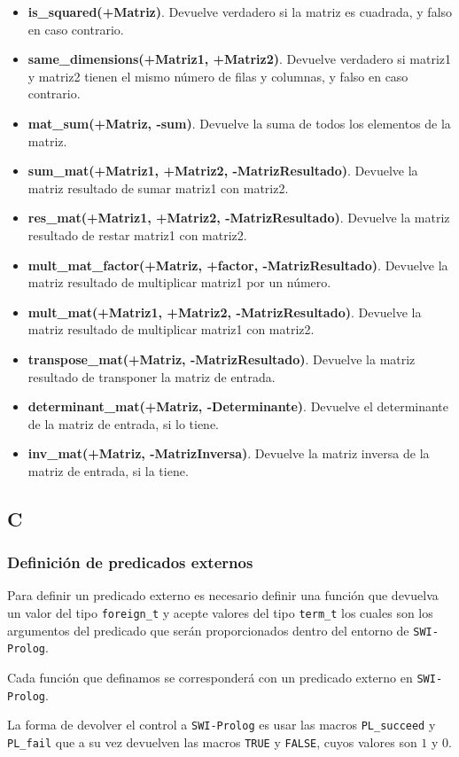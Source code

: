 \documentclass[a4paper]{article}
\begin{document}
\begin{itemize}
\item \textbf{is\_squared(+Matriz)}. Devuelve verdadero si la matriz es cuadrada, y falso en caso contrario.
\item \textbf{same\_dimensions(+Matriz1, +Matriz2)}. Devuelve verdadero si matriz1 y matriz2 tienen el mismo número de filas y columnas, y falso en caso contrario.
\item \textbf{mat\_sum(+Matriz, -sum)}. Devuelve la suma de todos los elementos de la matriz.
\item \textbf{sum\_mat(+Matriz1, +Matriz2, -MatrizResultado)}. Devuelve la matriz resultado de sumar matriz1 con matriz2.
\item \textbf{res\_mat(+Matriz1, +Matriz2, -MatrizResultado)}. Devuelve la matriz resultado de restar matriz1 con matriz2.
\item \textbf{mult\_mat\_factor(+Matriz, +factor, -MatrizResultado)}. Devuelve la matriz resultado de multiplicar matriz1 por un número.
\item \textbf{mult\_mat(+Matriz1, +Matriz2, -MatrizResultado)}. Devuelve la matriz resultado de multiplicar matriz1 con matriz2.
\item \textbf{transpose\_mat(+Matriz, -MatrizResultado)}. Devuelve la matriz resultado de transponer la matriz de entrada.
\item \textbf{determinant\_mat(+Matriz, -Determinante)}. Devuelve el determinante de la matriz de entrada, si lo tiene.
\item \textbf{inv\_mat(+Matriz, -MatrizInversa)}. Devuelve la matriz inversa de la matriz de entrada, si la tiene.
\end{itemize}
\subsection{C}
\subsubsection{Definición de predicados externos}
Para definir un predicado externo es necesario definir una función que devuelva un valor del tipo \texttt{foreign\_t} y acepte valores del tipo \texttt{term\_t} los cuales son los argumentos del predicado que serán proporcionados dentro del entorno de \texttt{SWI-Prolog}. 

Cada función que definamos se corresponderá con un predicado externo en \texttt{SWI-Prolog}.

La forma de devolver el control a \texttt{SWI-Prolog} es usar las macros \texttt{PL\_succeed} y \texttt{PL\_fail} que a su vez devuelven las macros \texttt{TRUE} y \texttt{FALSE}, cuyos valores son $1$ y $0$.
\end{document}
